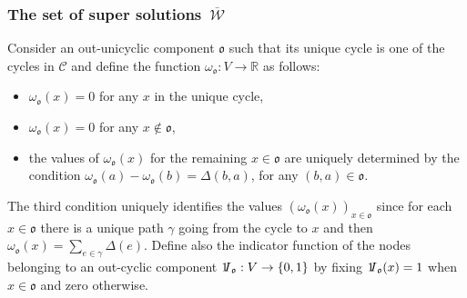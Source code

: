 \documentclass[reqno]{amsart}
\theoremstyle{plain}
\theoremstyle{definition}
\theoremstyle{remark}
\numberwithin{equation}{section}
\numberwithin{theorem}{section}
\newcommand{\upbar}[1]{\,\overline{\! #1}}
\newcommand{\id}{{1 \mskip -5mu {\rm I}}}
\newcommand{\<}{\langle}
\renewcommand{\>}{\rangle}
\begin{document}
\subsubsection{The set of super solutions $\upbar{\mathcal W}$ }
Consider an out-unicyclic component $\mathfrak o$ such that its unique cycle is one of the cycles in $\mathcal C$ and define the function $\omega_{\mathfrak o}:V\to \mathbb{R}$ as follows:
\begin{itemize}
	\item $\omega_{\mathfrak o}(x)=0$ for any $x$ in the unique cycle,
	
	\item $\omega_{\mathfrak o}(x)=0$ for any $x\not \in \mathfrak o$,
	
	\item the values of $\omega_{\mathfrak o}(x)$ for the remaining $x\in \mathfrak o$ are uniquely determined by  the condition $\omega_{\mathfrak o}(a)-\omega_{\mathfrak o}(b)=\Delta(b,a)$, for any $(b,a)\in \mathfrak o$. 
\end{itemize}
The third condition uniquely identifies the values $\left(\omega_{\mathfrak o}(x)\right)_{x\in \mathfrak o}$ since for each $x\in \mathfrak o$ there is a unique path $\gamma$ going from the cycle to $x$ and then $\omega_{\mathfrak o}(x)=\sum_{e\in \gamma}\Delta(e)$.
Define also the indicator function of the nodes belonging to an out-cyclic component $\id_{\mathfrak o}:V\to\{0,1\}$ by fixing $\id_{\mathfrak o}(x)=1$ when $x\in \mathfrak o$ and zero otherwise.
\end{document}
